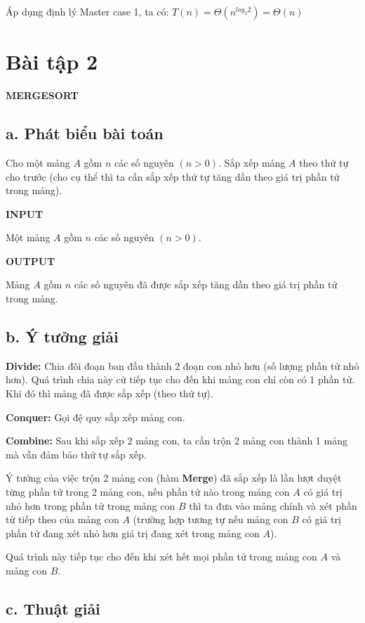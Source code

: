 \documentclass[12pt, a4paper, fleqn]{article}
\begin{document}
		Áp dụng định lý Master case 1, ta có: $T(n) = \Theta (n^{log_{2} {2}}) = \Theta (n)$
	
	\clearpage

	\section*{Bài tập 2}
	
	
	\textbf{MERGESORT}
	
	\subsection*{a. Phát biểu bài toán}
	Cho một mảng $A$ gồm $n$ các số nguyên $(n > 0)$. Sắp xếp mảng $A$ theo thứ tự cho trước (cho cụ thể thì ta cần sắp xếp thứ tự tăng dần theo giá trị phần tử trong mảng).
	
	\textbf{INPUT}
	
	Một mảng $A$ gồm $n$ các số nguyên $(n > 0)$.
	
	\textbf{OUTPUT}
	
	Mảng $A$ gồm $n$ các số nguyên đã được sắp xếp tăng dần theo giá trị phần tử trong mảng.
	
	\subsection*{b. Ý tưởng giải}
	
	\textbf{Divide:} Chia đôi đoạn ban đầu thành 2 đoạn con nhỏ hơn (số lượng phần tử nhỏ hơn). Quá trình chia này cứ tiếp tục cho đến khi mảng con chỉ còn có 1 phần tử. Khi đó thì mảng đã được sắp xếp (theo thứ tự).
	
	\textbf{Conquer:} Gọi đệ quy sắp xếp mảng con.
	
	\textbf{Combine:} Sau khi sắp xếp 2 mảng con, ta cần trộn 2 mảng con thành 1 mảng mà vẫn đảm bảo thứ tự sắp xếp.
	
	Ý tưởng của việc trộn 2 mảng con (hàm \textbf{Merge}) đã sắp xếp là lần lượt duyệt từng phần tử trong 2 mảng con, nếu phần tử nào trong mảng con $A$ có giá trị nhỏ hơn trong phần tử trong mảng con $B$ thì ta đưa vào mảng chính và xét phần tử tiếp theo của mảng con $A$ (trường hợp tương tự nếu mảng con $B$ có giá trị phần tử đang xét nhỏ hơn giá trị đang xét trong mảng con $A$).
	
	Quá trình này tiếp tục cho đến khi xét hết mọi phần tử trong mảng con $A$ và mảng con $B$.
	
	\subsection*{c. Thuật giải}
	
\end{document}
